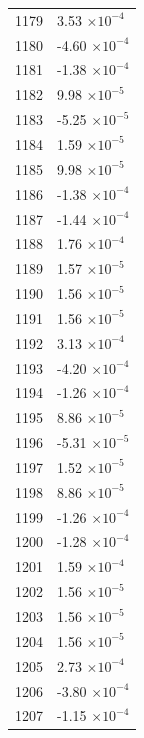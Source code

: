 \documentclass[a4paper,11pt]{article}
\begin{document}
\begin{center}
\begin{longtable}{|R{1.5cm}|R{2.5cm}|}
 1179 &         3.53 $\times 10^{          -4}$ \\
 1180 &        -4.60 $\times 10^{          -4}$ \\
 1181 &        -1.38 $\times 10^{          -4}$ \\
 1182 &         9.98 $\times 10^{          -5}$ \\
 1183 &        -5.25 $\times 10^{          -5}$ \\
 1184 &         1.59 $\times 10^{          -5}$ \\
 1185 &         9.98 $\times 10^{          -5}$ \\
 1186 &        -1.38 $\times 10^{          -4}$ \\
 1187 &        -1.44 $\times 10^{          -4}$ \\
 1188 &         1.76 $\times 10^{          -4}$ \\
 1189 &         1.57 $\times 10^{          -5}$ \\
 1190 &         1.56 $\times 10^{          -5}$ \\
 1191 &         1.56 $\times 10^{          -5}$ \\
 1192 &         3.13 $\times 10^{          -4}$ \\
 1193 &        -4.20 $\times 10^{          -4}$ \\
 1194 &        -1.26 $\times 10^{          -4}$ \\
 1195 &         8.86 $\times 10^{          -5}$ \\
 1196 &        -5.31 $\times 10^{          -5}$ \\
 1197 &         1.52 $\times 10^{          -5}$ \\
 1198 &         8.86 $\times 10^{          -5}$ \\
 1199 &        -1.26 $\times 10^{          -4}$ \\
 1200 &        -1.28 $\times 10^{          -4}$ \\
 1201 &         1.59 $\times 10^{          -4}$ \\
 1202 &         1.56 $\times 10^{          -5}$ \\
 1203 &         1.56 $\times 10^{          -5}$ \\
 1204 &         1.56 $\times 10^{          -5}$ \\
 1205 &         2.73 $\times 10^{          -4}$ \\
 1206 &        -3.80 $\times 10^{          -4}$ \\
 1207 &        -1.15 $\times 10^{          -4}$ \\

\end{longtable}
\end{center}
\end{document}
